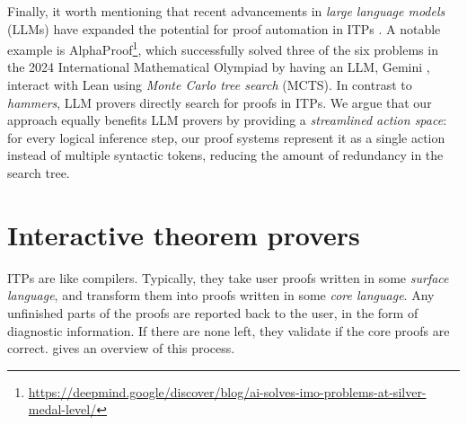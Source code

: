 \documentclass[twoside]{report}
\begin{document}
Finally, it worth mentioning that recent advancements in \emph{large language models} (LLMs) have expanded the potential for proof automation in ITPs \cite{yang2024formal}. A notable example is AlphaProof\footnote{\url{https://deepmind.google/discover/blog/ai-solves-imo-problems-at-silver-medal-level/}}, which successfully solved three of the six problems in the 2024 International Mathematical Olympiad by having an LLM, Gemini \cite{team2024gemini}, interact with Lean using \emph{Monte Carlo tree search} (MCTS). In contrast to \emph{hammers}, LLM provers directly search for proofs in ITPs. We argue that our approach equally benefits LLM provers by providing a \emph{streamlined action space}: for every logical inference step, our proof systems represent it as a single action instead of multiple syntactic tokens, reducing the amount of redundancy in the search tree.


\section{Interactive theorem provers}
\label{sec:introduction_itp}

ITPs are like compilers. Typically, they take user proofs written in some \emph{surface language}, and transform them into proofs written in some \emph{core language}. Any unfinished parts of the proofs are reported back to the user, in the form of diagnostic information. If there are none left, they validate if the core proofs are correct.  gives an overview of this process.
\end{document}
